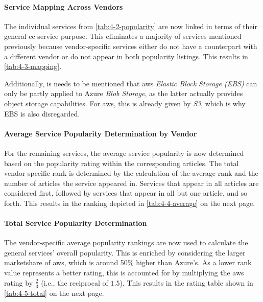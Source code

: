 \paragraph{Service Mapping Across Vendors}
The individual services from \autoref{tab:4-2-popularity} are now linked in terms of their general \ac{cc} service purpose. This eliminates a majority of services mentioned previously because vendor-specific services either do not have a counterpart with a different vendor or do not appear in both popularity listings. This results in \autoref{tab:4-3-mapping}.


Additionally, is needs to be mentioned that \ac{aws} \textit{Elastic Block Storage (EBS)} can only be partly applied to Azure \textit{Blob Storage}, as the latter actually provides object storage capabilities. For \ac{aws}, this is already given by \textit{S3}, which is why EBS is also disregarded.

\paragraph{Average Service Popularity Determination by Vendor}
For the remaining services, the average service popularity is now determined based on the popularity rating within the corresponding articles. The total vendor-specific rank is determined by the calculation of the average rank and the number of articles the service appeared in. Services that appear in all articles are considered first, followed by services that appear in all but one article, and so forth. This results in the ranking depicted in \autoref{tab:4-4-average} on the next page. \newpage


\paragraph{Total Service Popularity Determination}
The vendor-specific average popularity rankings are now used to calculate the general services' overall popularity. This is enriched by considering the larger marketshare of \ac{aws}, which is around 50\% higher than Azure's. As a lower rank value represents a better rating, this is accounted for by multiplying the \ac{aws} rating by $\frac{2}{3}$ (i.e., the reciprocal of $1.5$). This results in the rating table shown in \autoref{tab:4-5-total} on the next page. \newpage


